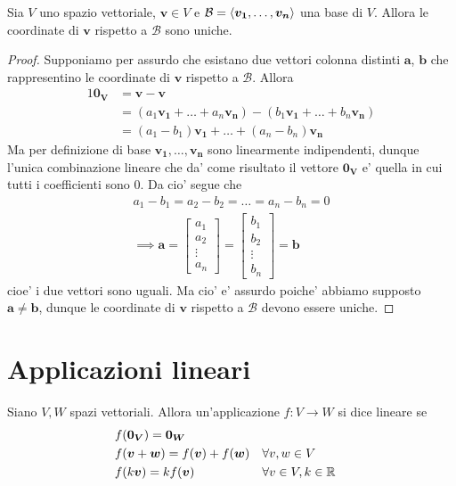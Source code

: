 \begin{proposition}
    Sia $V$ uno spazio vettoriale, $\bm{v} \in V$ e $\mathcal{B} = \left\langle \bm{v_1}, \dots, \bm{v_n} \right\rangle$ una base di $V$. Allora le coordinate di $\bm{v}$ rispetto a $\mathcal{B}$ sono uniche.
\end{proposition}
\begin{proof}
    Supponiamo per assurdo che esistano due vettori colonna distinti $\bm{a}$, $\bm{b}$ che rappresentino le coordinate di $\bm{v}$ rispetto a $\mathcal{B}$. Allora
    \begin{alignat*}
        {1}
        \bm{0_V}  &= \bm{v} - \bm{v} \\
                &= (a_1\bm{v_1} + \dots + a_n\bm{v_n}) - (b_1\bm{v_1} + \dots + b_n\bm{v_n}) \\
                &= (a_1 - b_1)\bm{v_1} + \dots + (a_n - b_n)\bm{v_n}
    \end{alignat*}
    Ma per definizione di base $\bm{v_1}, \dots, \bm{v_n}$ sono linearmente indipendenti, dunque l'unica combinazione lineare che da' come risultato il vettore $\bm{0_V}$ e' quella in cui tutti i coefficienti sono $0$. Da cio' segue che
    \begin{gather*}
        a_1 - b_1 = a_2 - b_2 = \dots = a_n - b_n = 0 \\
        \implies \bm{a} = \begin{bmatrix}
            a_1 \\
            a_2 \\
            \vdots \\
            a_n
        \end{bmatrix}
        = 
        \begin{bmatrix}
            b_1 \\
            b_2 \\
            \vdots \\
            b_n
        \end{bmatrix} = \bm{b}
    \end{gather*}
    cioe' i due vettori sono uguali. Ma cio' e' assurdo poiche' abbiamo supposto $\bm{a} \neq \bm{b}$, dunque le coordinate di $\bm{v}$ rispetto a $\mathcal{B}$ devono essere uniche.
\end{proof}

\section{Applicazioni lineari}

\begin{definition}
    Siano $V, W$ spazi vettoriali. Allora un'applicazione $f : V \to W$ si dice lineare
    se
    \begin{align}
        &f(\bm{0_V}) = \bm{0_W} \\
        &f(\bm{v} + \bm{w}) = f(\bm{v}) + f(\bm{w}) &&\forall v, w \in V \\
        &f(k\bm{v}) = kf(\bm{v})                    &&\forall v\in V, k \in \mathbb{R} 
    \end{align}
\end{definition}